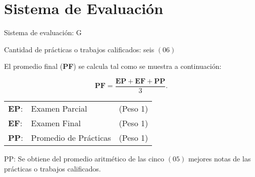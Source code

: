 \section{Sistema de Evaluación}

\noindent

Sistema de evaluación: G

Cantidad de prácticas o trabajos calificados: seis $\left(06\right)$

El promedio final (\textbf{PF}) se calcula tal como se muestra a
continuación:


\begin{equation*}
  \textbf{PF} =
  \frac{
    \textbf{EP}+
    \textbf{EF}+
    \textbf{PP}
  }{3}.
\end{equation*}

\begin{table}[ht!]
  \begin{tabular}{lll}
    \textbf{EP}: & Examen Parcial        & (Peso 1) \\
    \textbf{EF}: & Examen Final          & (Peso 1) \\
    \textbf{PP}: & Promedio de Prácticas & (Peso 1) \\
  \end{tabular}
\end{table}

PP: Se obtiene del promedio aritmético de las cinco $\left(05\right)$
mejores notas de las prácticas o trabajos calificados.






